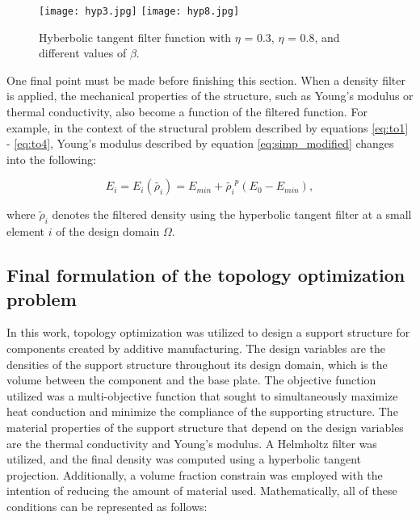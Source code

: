 \documentclass[../main.tex]{subfiles}
\begin{document}
\begin{figure}
  \texttt{[image: hyp3.jpg]} \hfill
  \texttt{[image: hyp8.jpg]} \hfill
  \caption{Hyberbolic tangent filter function with $\eta$ = 0.3, $\eta$ = 0.8, and different values of $\beta$.}
  \label{fig:tanh_filter}
\end{figure}

One final point must be made before finishing this section. When a density filter is applied, the mechanical properties of the structure, such as Young's modulus or thermal conductivity, also become a function of the filtered function. For example, in the context of the structural problem described by equations \ref{eq:to1} - \ref{eq:to4}, Young's modulus described by equation \ref{eq:simp_modified} changes into the following:

\begin{equation}
  E_i = E_i(\tilde{\rho_i}) = E_{min} + \tilde{\rho_i}^p (E_0 - E_{min}),
  \label{eq:young_filtered}
\end{equation}

where $\tilde{\rho}_i$ denotes the filtered density using the hyperbolic tangent filter at a small element $i$ of the design domain $\Omega$. 

\subsection{Final formulation of the topology optimization problem}

In this work, topology optimization was utilized to design a support structure for components created by additive manufacturing. The design variables are the densities of the support structure throughout its design domain, which is the volume between the component and the base plate. The objective function utilized was a multi-objective function that sought to simultaneously maximize heat conduction and minimize the compliance of the supporting structure. The material properties of the support structure that depend on the design variables are the thermal conductivity and Young's modulus. A Helmholtz filter was utilized, and the final density was computed using a hyperbolic tangent projection. Additionally, a volume fraction constrain was employed with the intention of reducing the amount of material used. Mathematically, all of these conditions can be represented as follows:
\end{document}
